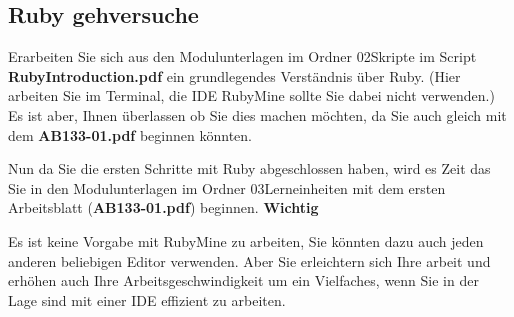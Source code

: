 \subsection{Ruby gehversuche}\label{subsec:rubygehversuche}
\begin{frame}[fragile]
    Erarbeiten Sie sich aus den Modulunterlagen im Ordner 02\textunderscore Skripte im Script \textbf{RubyIntroduction.pdf} ein grundlegendes Verständnis
    über Ruby. (Hier arbeiten Sie im Terminal, die IDE RubyMine sollte Sie dabei nicht verwenden.)
    Es ist aber, Ihnen überlassen ob Sie dies machen möchten, da Sie auch gleich mit dem \textbf{AB133-01.pdf} beginnen könnten.
\end{frame}

\begin{frame}[fragile]
    Nun da Sie die ersten Schritte mit Ruby abgeschlossen haben, wird es Zeit das Sie in den Modulunterlagen im Ordner
    03\textunderscore Lerneinheiten mit dem ersten Arbeitsblatt (\textbf{AB133-01.pdf}) beginnen.
    \textbf{Wichtig}
    \vSpaceStyle{0.1em}

    Es ist keine Vorgabe mit RubyMine zu arbeiten, Sie könnten dazu auch jeden anderen beliebigen Editor verwenden.
    Aber Sie erleichtern sich Ihre arbeit und erhöhen auch Ihre Arbeitsgeschwindigkeit um ein Vielfaches, wenn Sie in der Lage
    sind mit einer IDE effizient zu arbeiten.
\end{frame}